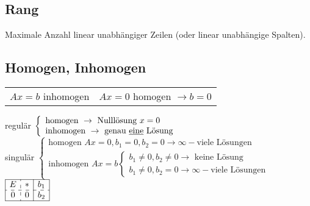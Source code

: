 \subsection{Rang}
	Maximale Anzahl linear unabhängiger Zeilen (oder linear unabhängige Spalten).

\subsection{Homogen, Inhomogen}
	\begin{tabular}{ll}
		$Ax = b$ inhomogen & $Ax = 0$ homogen $\rightarrow b=0$\\
	\end{tabular}

	regulär $\left\lbrace\begin{array}{l}
		\text{homogen } \rightarrow \text{ Nulllösung } x=0\\
		\text{inhomogen } \rightarrow \text{ genau \underline{eine} Lösung }\end{array}\right.$ \\
	
	singulär $\left\lbrace\begin{array}{l}
		\text{homogen } Ax=0, b_1=0, b_2=0 \rightarrow \infty-\text{viele Lösungen}\\
		\text{inhomogen } Ax = b \left\lbrace\begin{array}{l}
			b_1 \neq 0, b_2 \neq 0 \rightarrow \text{ keine Lösung}\\
			b_1 \neq 0, b_2 =0 \rightarrow \infty-\text{viele Lösungen} \end{array}\right. \end{array}\right.$ \qquad 
		$ \begin{array}{|c : c|c|}
			\hline E & * & b_1 \\
			\hdashline 0 & 0 & b_2 \\
			\hline \end{array}$ \\

